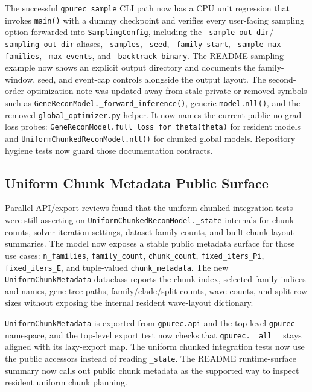 \documentclass[11pt]{article}
\begin{document}
The successful \texttt{gpurec sample} CLI path now has a CPU unit regression
that invokes \texttt{main()} with a dummy checkpoint and verifies every
user-facing sampling option forwarded into \texttt{SamplingConfig}, including
the \texttt{--sample-out-dir}/\texttt{--sampling-out-dir} aliases,
\texttt{--samples}, \texttt{--seed}, \texttt{--family-start},
\texttt{--sample-max-families}, \texttt{--max-events}, and
\texttt{--backtrack-binary}.  The README sampling example now shows an
explicit output directory and documents the family-window, seed, and event-cap
controls alongside the output layout.  The second-order optimization note was
updated away from stale private or removed symbols such as
\texttt{GeneReconModel.\_forward\_inference()}, generic
\texttt{model.nll()}, and the removed \texttt{global\_optimizer.py} helper.
It now names the current public no-grad loss probes:
\texttt{GeneReconModel.full\_loss\_for\_theta(theta)} for resident models and
\texttt{UniformChunkedReconModel.nll()} for chunked global models.  Repository
hygiene tests now guard those documentation contracts.

\subsection{Uniform Chunk Metadata Public Surface}

Parallel API/export reviews found that the uniform chunked integration tests
were still asserting on \texttt{UniformChunkedReconModel.\_state} internals for
chunk counts, solver iteration settings, dataset family counts, and built
chunk layout summaries.  The model now exposes a stable public metadata
surface for those use cases: \texttt{n\_families}, \texttt{family\_count},
\texttt{chunk\_count}, \texttt{fixed\_iters\_Pi},
\texttt{fixed\_iters\_E}, and tuple-valued \texttt{chunk\_metadata}.  The new
\texttt{UniformChunkMetadata} dataclass reports the chunk index, selected
family indices and names, gene tree paths, family/clade/split counts, wave
counts, and split-row sizes without exposing the internal resident wave-layout
dictionary.

\texttt{UniformChunkMetadata} is exported from \texttt{gpurec.api} and the
top-level \texttt{gpurec} namespace, and the top-level export test now checks
that \texttt{gpurec.\_\_all\_\_} stays aligned with its lazy-export map.  The
uniform chunked integration tests now use the public accessors instead of
reading \texttt{\_state}.  The README runtime-surface summary now calls out
public chunk metadata as the supported way to inspect resident uniform chunk
planning.
\end{document}
